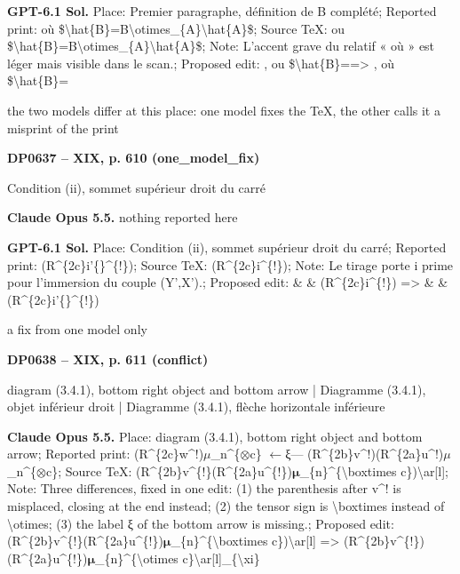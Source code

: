 \textbf{GPT-6.1 Sol.} Place: Premier paragraphe, définition de B complété; Reported print: où \$\textbackslash{}hat\{B\}=\allowbreak B\textbackslash{}otimes\_\{A\}\textbackslash{}hat\{A\}\$; Source TeX: ou \$\textbackslash{}hat\{B\}=\allowbreak B\textbackslash{}otimes\_\{A\}\textbackslash{}hat\{A\}\$; Note: L'accent grave du relatif « où » est léger mais visible dans le scan.; Proposed edit: , ou \$\textbackslash{}hat\{B\}=\allowbreak  =\allowbreak > , où \$\textbackslash{}hat\{B\}=\allowbreak \par
the two models differ at this place: one model fixes the TeX, the other calls it a misprint of the print\par
\par\noindent\hypertarget{DP0637}{}\textbf{DP0637 -- XIX, p. 610 (one\_model\_fix)}\par
Condition (ii), sommet supérieur droit du carré\par
\textbf{Claude Opus 5.5.} nothing reported here\par
\textbf{GPT-6.1 Sol.} Place: Condition (ii), sommet supérieur droit du carré; Reported print: (R\textasciicircum{}\{2c\}i'\{\}\textasciicircum{}\{!\}); Source TeX: (R\textasciicircum{}\{2c\}i\textasciicircum{}\{!\}); Note: Le tirage porte i prime pour l'immersion du couple (Y',X').; Proposed edit: \& \& (R\textasciicircum{}\{2c\}i\textasciicircum{}\{!\}) =\allowbreak > \& \& (R\textasciicircum{}\{2c\}i'\{\}\textasciicircum{}\{!\})\par
a fix from one model only\par
\par\noindent\hypertarget{DP0638}{}\textbf{DP0638 -- XIX, p. 611 (conflict)}\par
diagram (3.4.1), bottom right object and bottom arrow | Diagramme (3.4.1), objet inférieur droit | Diagramme (3.4.1), flèche horizontale inférieure\par
\textbf{Claude Opus 5.5.} Place: diagram (3.4.1), bottom right object and bottom arrow; Reported print: (R\textasciicircum{}\{2c\}w\textasciicircum{}!)\ensuremath{\mu}\_n\textasciicircum{}\{\ensuremath{\otimes}c\} \ensuremath{\leftarrow}ξ— (R\textasciicircum{}\{2b\}v\textasciicircum{}!)(R\textasciicircum{}\{2a\}u\textasciicircum{}!)\ensuremath{\mu}\_n\textasciicircum{}\{\ensuremath{\otimes}c\}; Source TeX: (R\textasciicircum{}\{2b\}v\textasciicircum{}\{!\}(R\textasciicircum{}\{2a\}u\textasciicircum{}\{!\})\ensuremath{𝛍}\_\{n\}\textasciicircum{}\{\textbackslash{}boxtimes c\})\textbackslash{}ar[l]; Note: Three differences, fixed in one edit: (1) the parenthesis after v\textasciicircum{}! is misplaced, closing at the end instead; (2) the tensor sign is \textbackslash{}boxtimes instead of \textbackslash{}otimes; (3) the label ξ of the bottom arrow is missing.; Proposed edit: (R\textasciicircum{}\{2b\}v\textasciicircum{}\{!\}(R\textasciicircum{}\{2a\}u\textasciicircum{}\{!\})\ensuremath{𝛍}\_\{n\}\textasciicircum{}\{\textbackslash{}boxtimes c\})\textbackslash{}ar[l] =\allowbreak > (R\textasciicircum{}\{2b\}v\textasciicircum{}\{!\})(R\textasciicircum{}\{2a\}u\textasciicircum{}\{!\})\ensuremath{𝛍}\_\{n\}\textasciicircum{}\{\textbackslash{}otimes c\}\textbackslash{}ar[l]\_\{\textbackslash{}xi\}\par
